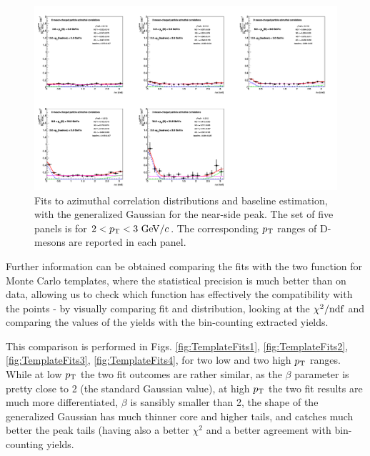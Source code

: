 \begin{figure}[h]
\centering
\includegraphics[width=0.99\linewidth, height=0.70\linewidth,angle=270]{figures/Fits/cFitting_0_pthad2dot0to3dot0_Alt.png}
\caption{Fits to azimuthal correlation distributions and baseline estimation, with the generalized Gaussian for the near-side peak. The set of five panels is for $2<p_{\rm T}<3~\mathrm{GeV}/c$. The corresponding $p_{\rm T}$ ranges of D-mesons are reported in each panel.}
\label{fig:AltFit5}
\end{figure}

\clearpage
Further information can be obtained comparing the fits with the two function for Monte Carlo templates, where the statistical precision is much better than on data, allowing us to check which function has effectively the compatibility with the points - by visually comparing fit and distribution, looking at the $\chi^2/{\rm ndf}$ and comparing the values of the yields with the bin-counting extracted yields.

This comparison is performed in Figs. \ref{fig:TemplateFits1}, \ref{fig:TemplateFits2}, \ref{fig:TemplateFits3}, \ref{fig:TemplateFits4}, for two low and two high $p_{\rm T}$ ranges. While at low $p_{\rm T}$ the two fit outcomes are rather similar, as the $\beta$ parameter is pretty close to 2 (the standard Gaussian value), at high $p_{\rm T}$ the two fit results are much more differentiated, $\beta$ is sansibly smaller than 2, the shape of the generalized Gaussian has much thinner core and higher tails, and catches much better the peak tails (having also a better $\chi^2$ and a better agreement with bin-counting yields.

